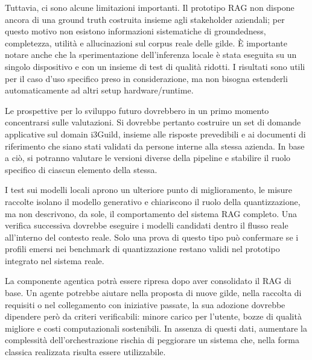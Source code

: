 \documentclass[12pt,a4paper]{article}
\begin{document}
Tuttavia, ci sono alcune limitazioni importanti. Il prototipo RAG non dispone ancora di una ground
truth costruita insieme agli stakeholder aziendali; per questo motivo non esistono informazioni
sistematiche di groundedness, completezza, utilità e allucinazioni sul corpus
reale delle gilde. È importante notare anche che la sperimentazione dell'inferenza locale 
è stata eseguita su un singolo dispositivo e con un insieme di test di qualità ridotti. 
I risultati sono utili per il caso d'uso specifico preso in considerazione, ma non bisogna 
estenderli automaticamente ad altri setup hardware/runtime.

Le prospettive per lo sviluppo futuro dovrebbero in un primo momento concentrarsi sulle valutazioni. 
Si dovrebbe pertanto costruire un set di domande applicative sul domain i3Guild, insieme alle 
risposte prevedibili e ai documenti di riferimento che siano stati validati da persone interne 
alla stessa azienda. In base a ciò, si potranno valutare le versioni diverse della pipeline 
e stabilire il ruolo specifico di ciascun elemento della stessa.

I test sui modelli locali aprono un ulteriore punto di miglioramento, le misure raccolte
isolano il modello generativo e chiariscono il ruolo della quantizzazione, ma
non descrivono, da sole, il comportamento del sistema RAG completo. Una verifica
successiva dovrebbe eseguire i modelli candidati dentro il flusso reale all'interno del contesto reale. 
Solo una prova di questo tipo può confermare se i profili emersi nei benchmark di quantizzazione restano validi
nel prototipo integrato nel sistema reale.

La componente agentica potrà essere ripresa dopo aver consolidato il RAG di
base. Un agente potrebbe aiutare nella proposta di nuove gilde, nella raccolta
di requisiti o nel collegamento con iniziative passate, la sua adozione dovrebbe
dipendere però da criteri verificabili: minore carico per l'utente, bozze
di qualità migliore e costi computazionali sostenibili. In assenza di
questi dati, aumentare la complessità dell'orchestrazione rischia di
peggiorare un sistema che, nella forma classica realizzata risulta essere utilizzabile.
\end{document}
